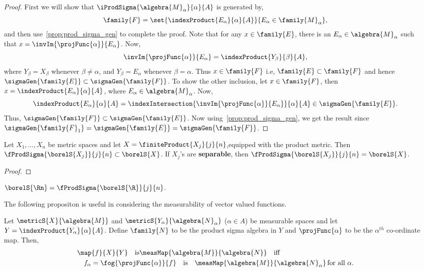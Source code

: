 \begin{proof}
    First we will show that $\iProdSigma{\algebra{M}_{\alpha}}{\alpha}{A}$ is generated by,
    \[\family{F} = \set{\indexProduct{E_{\alpha}}{\alpha}{A}}{E_{\alpha} \in \family{M}_{\alpha}},\]
    and then use~\ref{prop:prod_sigma_gen} to complete the proof.
    Note that for any $x \in \family{E}$, there is an $E_{\alpha} \in \algebra{M}_{\alpha}$ such that $x =
    \invIm{\projFunc{\alpha}}{E_{\alpha}}$. Now,
    \[\invIm{\projFunc{\alpha}}{E_{\alpha}} = \indexProduct{Y_{\beta}}{\beta}{A},\]
    where $Y_{\beta} = X_{\beta}$ whenever $\beta \neq \alpha$, and $Y_{\beta} = E_{\alpha}$ whenever 
    $\beta = \alpha$. Thus $x \in \family{F}$ i.e, $\family{E} \subset \family{F}$ and hence
    $\sigmaGen{\family{E}}\subset \sigmaGen{\family{F}}$. To show the other inclusion, let $x \in
    \family{F}$,
    then $x = \indexProduct{E_{\alpha}}{\alpha}{A}$, where $E_{\alpha} \in \algebra{M}_{\alpha}$. Now,
    \[\indexProduct{E_{\alpha}}{\alpha}{A} =
	\indexIntersection{\invIm{\projFunc{\alpha}}{E_{\alpha}}}{\alpha}{A} \in \sigmaGen{\family{E}}.\]
    Thus, $\sigmaGen{\family{F}} \subset \sigmaGen{\family{E}}$. Now using~\ref{prop:prod_sigma_gen}, we get
    the result since $\sigmaGen{\family{F}_1} = \sigmaGen{\family{E}} = \sigmaGen{\family{F}}$.
\end{proof}
\begin{Theorem}[name=Sigma Algebra in product metric space]
    Let $X_1,\ldots,X_n$ be metric spaces and let $X = \finiteProduct{X_j}{j}{n}$,equipped with the product
    metric. Then $\fProdSigma{\borelS{X_j}}{j}{n} \subset \borelS{X}$. If $X_j$'s are \textbf{separable}, then
    $\fProdSigma{\borelS{X_j}}{j}{n} = \borelS{X}$.
\end{Theorem}
\begin{proof}
\end{proof}
\begin{Corollary}\label{thm:prod_sigma_algeb_Rn}
    $\borelS{\Rn} = \fProdSigma{\borelS{\R}}{j}{n}$.
\end{Corollary}
The following propositon is useful in considering the measurability of vector valued functions.
\begin{Theorem}\label{thm:meas_component_func}
    Let $\metricS{X}{\algebra{M}}$ and $\metricS{{Y}_{\alpha}}{\algebra{N}_{\alpha}}$ ($\alpha \in A$)
    be measurable spaces and let $Y = \indexProduct{Y_{\alpha}}{\alpha}{A}$. Define $\family{N}$ to be the product
    sigma algebra in $Y$ and $\projFunc{\alpha}$ to be the $\alpha^{th}$ co-ordinate map. Then,
    \begin{align*}
	&\map{f}{X}{Y}\quad\text{is}\measMap{\algebra{M}}{\algebra{N}}\quad\text{iff} \\
	&\quad 
	f_{\alpha} = \fog{\projFunc{\alpha}}{f}\quad \text{is} \quad \measMap{\algebra{M}}{\algebra{N}_{\alpha}} 
	\,\text{for all $\alpha$}.
    \end{align*}
\end{Theorem}
